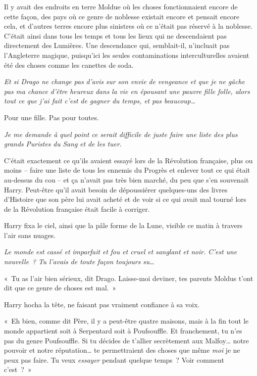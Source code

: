 Il y avait des endroits en terre Moldue où les choses fonctionnaient encore de cette façon, des pays où ce genre de noblesse existait encore et pensait encore cela, et d'autres terres encore plus sinistres où ce n'était pas réservé à la noblesse. C'était ainsi dans tous les temps et tous les lieux qui ne descendaient pas directement des Lumières. Une descendance qui, semblait-il, n'incluait pas l'Angleterre magique, puisqu'ici les seules contaminations interculturelles avaient été des choses comme les canettes de soda.

\emph{Et si Drago ne change pas d'avis sur son envie de vengeance et que je ne gâche pas ma chance d'être heureux dans la vie en épousant une pauvre fille folle, alors tout ce que j'ai fait c'est de gagner du temps, et pas beaucoup…}

Pour une fille. Pas pour toutes.

\emph{Je me demande à quel point ce serait difficile de juste faire une liste des plus grands Puristes du Sang et de les tuer.}

C'était exactement ce qu'ils avaient essayé lors de la Révolution française, plus ou moins -- faire une liste de tous les ennemis du Progrès et enlever tout ce qui était au-dessus du cou -- et ça n'avait pas très bien marché, du peu que s'en souvenait Harry. Peut-être qu'il avait besoin de dépoussiérer quelques-uns des livres d'Histoire que son père lui avait acheté et de voir si ce qui avait mal tourné lors de la Révolution française était facile à corriger.

Harry fixa le ciel, ainsi que la pâle forme de la Lune, visible ce matin à travers l'air sans nuages.

\emph{Le monde est cassé et imparfait et fou et cruel et sanglant et noir. C'est une nouvelle~? Tu l'avais de toute façon toujours su…}

«~Tu as l'air bien sérieux, dit Drago. Laisse-moi deviner, tes parents Moldus t'ont dit que ce genre de choses est mal.~»

Harry hocha la tête, ne faisant pas vraiment confiance à sa voix.

«~Eh bien, comme dit Père, il y a peut-être quatre maisons, mais à la fin tout le monde appartient soit à Serpentard soit à Poufsouffle. Et franchement, tu n'es pas du genre Poufsouffle. Si tu décides de t'allier secrètement aux Malfoy… notre pouvoir et notre réputation… te permettraient des choses que même \emph{moi} je ne peux pas faire. Tu veux \emph{essayer} pendant quelque temps~? Voir comment c'est~?~»

